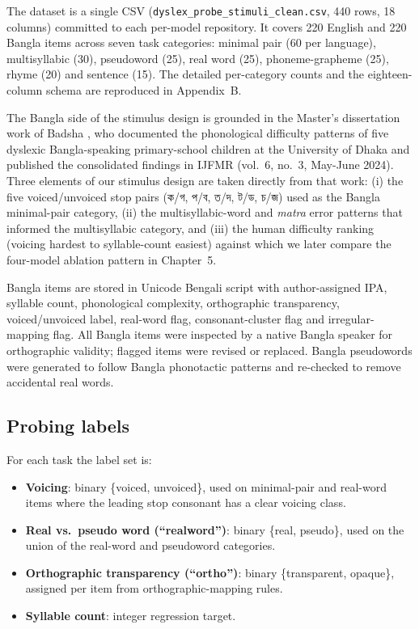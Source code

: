 The dataset is a single CSV (\texttt{dyslex\_probe\_stimuli\_clean.csv}, 440 rows, 18 columns) committed to each per-model repository. It covers 220 English and 220 Bangla items across seven task categories: minimal pair (60 per language), multisyllabic (30), pseudoword (25), real word (25), phoneme-grapheme (25), rhyme (20) and sentence (15). The detailed per-category counts and the eighteen-column schema are reproduced in Appendix~B.

The Bangla side of the stimulus design is grounded in the Master's dissertation work of Badsha \cite{badsha2024mall}, who documented the phonological difficulty patterns of five dyslexic Bangla-speaking primary-school children at the University of Dhaka and published the consolidated findings in IJFMR (vol.\ 6, no.\ 3, May-June 2024). Three elements of our stimulus design are taken directly from that work: (i) the five voiced/unvoiced stop pairs ({\banglafont ক/গ}, {\banglafont প/ব}, {\banglafont ত/দ}, {\banglafont ট/ড}, {\banglafont চ/জ}) used as the Bangla minimal-pair category, (ii) the multisyllabic-word and \textit{matra} error patterns that informed the multisyllabic category, and (iii) the human difficulty ranking (voicing hardest to syllable-count easiest) against which we later compare the four-model ablation pattern in Chapter~5.

Bangla items are stored in Unicode Bengali script with author-assigned IPA, syllable count, phonological complexity, orthographic transparency, voiced/unvoiced label, real-word flag, consonant-cluster flag and irregular-mapping flag. All Bangla items were inspected by a native Bangla speaker for orthographic validity; flagged items were revised or replaced. Bangla pseudowords were generated to follow Bangla phonotactic patterns and re-checked to remove accidental real words.

\subsection{Probing labels}

For each task the label set is:
\begin{itemize}
    \item \textbf{Voicing}: binary \{voiced, unvoiced\}, used on minimal-pair and real-word items where the leading stop consonant has a clear voicing class.
    \item \textbf{Real vs.\ pseudo word (``realword'')}: binary \{real, pseudo\}, used on the union of the real-word and pseudoword categories.
    \item \textbf{Orthographic transparency (``ortho'')}: binary \{transparent, opaque\}, assigned per item from orthographic-mapping rules.
    \item \textbf{Syllable count}: integer regression target.
\end{itemize}

